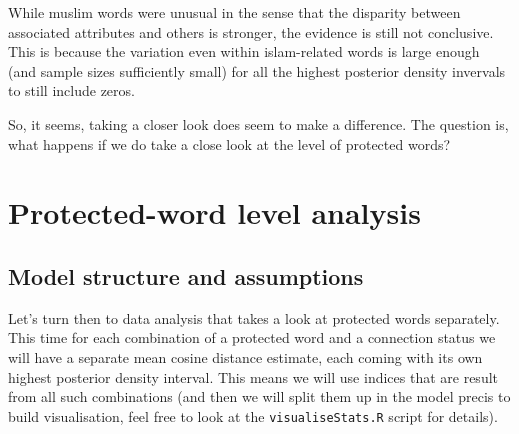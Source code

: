 \documentclass[12pt,]{book}
\begin{document}
\normalsize

While muslim words were unusual in the sense that the disparity between
associated attributes and others is stronger, the evidence is still not
conclusive. This is because the variation even within islam-related
words is large enough (and sample sizes sufficiently small) for all the
highest posterior density invervals to still include zeros.

So, it seems, taking a closer look does seem to make a difference. The
question is, what happens if we do take a close look at the level of
protected words?

\chapter{Protected-word level
analysis}\label{protected-word-level-analysis}

\section{Model structure and
assumptions}\label{model-structure-and-assumptions}

Let's turn then to data analysis that takes a look at protected words
separately. This time for each combination of a protected word and a
connection status we will have a separate mean cosine distance estimate,
each coming with its own highest posterior density interval. This means
we will use indices that are result from all such combinations (and then
we will split them up in the model precis to build visualisation, feel
free to look at the \texttt{visualiseStats.R} script for details).

\vspace{1mm} \footnotesize
\end{document}
